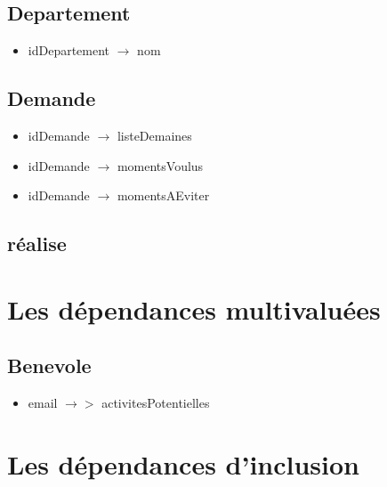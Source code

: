\documentclass[asi, sansVersion]{picInsa}
\begin{document}
\subsection*{Departement}
\begin{itemize}
\item[] idDepartement $\rightarrow$ nom
\end{itemize}

\subsection*{Demande}
\begin{itemize}
\item[] idDemande $\rightarrow$ listeDemaines 
\item[] idDemande $\rightarrow$ momentsVoulus
\item[] idDemande $\rightarrow$ momentsAEviter
\end{itemize}
 

\subsection*{réalise}

\section{Les dépendances multivaluées}

\subsection*{Benevole}
\begin{itemize}
\item[] email $\rightarrow > $ activitesPotentielles 
\end{itemize}

\section{Les dépendances d'inclusion}
\end{document}

